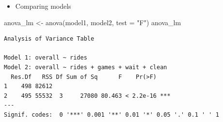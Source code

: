 \documentclass[
  ignorenonframetext,
]{beamer}
\newenvironment{Shaded}{\begin{snugshade}}{\end{snugshade}}
\newcommand{\AttributeTok}[1]{\textcolor[rgb]{0.40,0.45,0.13}{#1}}
\newcommand{\FunctionTok}[1]{\textcolor[rgb]{0.28,0.35,0.67}{#1}}
\newcommand{\NormalTok}[1]{\textcolor[rgb]{0.00,0.23,0.31}{#1}}
\newcommand{\OtherTok}[1]{\textcolor[rgb]{0.00,0.23,0.31}{#1}}
\newcommand{\StringTok}[1]{\textcolor[rgb]{0.13,0.47,0.30}{#1}}
\providecommand{\tightlist}{%
  \setlength{\itemsep}{0pt}\setlength{\parskip}{0pt}}\usepackage{longtable,booktabs,array}
\begin{document}
\begin{frame}[fragile]{}
\label{section-29}
\begin{itemize}
\item
  Comparing models

\end{itemize}

\tiny

\begin{Shaded}
\begin{Highlighting}[]
\NormalTok{anova\_lm }\OtherTok{\textless{}{-}} \FunctionTok{anova}\NormalTok{(model1, model2, }\AttributeTok{test =} \StringTok{"F"}\NormalTok{)}
\NormalTok{anova\_lm}
\end{Highlighting}
\end{Shaded}

\begin{verbatim}
Analysis of Variance Table

Model 1: overall ~ rides
Model 2: overall ~ rides + games + wait + clean
  Res.Df   RSS Df Sum of Sq      F    Pr(>F)    
1    498 82612                                  
2    495 55532  3     27080 80.463 < 2.2e-16 ***
---
Signif. codes:  0 '***' 0.001 '**' 0.01 '*' 0.05 '.' 0.1 ' ' 1
\end{verbatim}
\end{frame}
\end{document}

